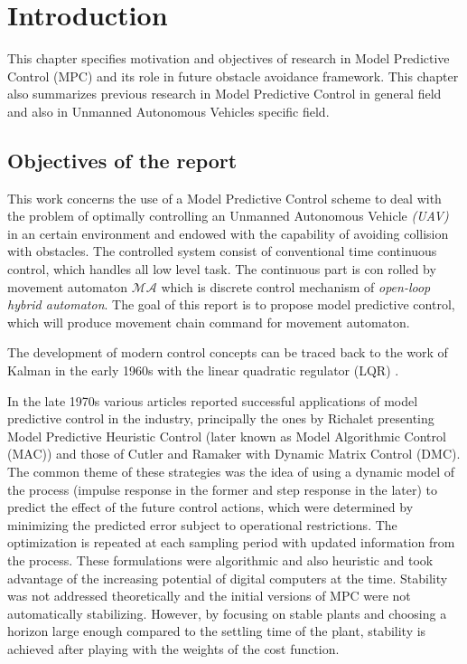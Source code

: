 \chapter{Introduction}\label{ch:introduction}

\noindent This chapter specifies motivation and objectives of research in Model Predictive Control (MPC) and its role in future obstacle avoidance framework. This chapter also summarizes previous research in Model Predictive Control in general field and also in Unmanned Autonomous Vehicles specific field.

\section{Objectives of the report}\noindent
This work concerns the use of a Model Predictive Control scheme to deal with the problem of optimally controlling an Unmanned Autonomous Vehicle \textit{(UAV)} in an certain environment and endowed with the capability of avoiding collision with obstacles. The controlled system consist of conventional time continuous control, which handles all low level task. The continuous part is con rolled by movement automaton $\mathscr{MA}$ which is discrete control mechanism of \textit{open-loop hybrid automaton}. The goal of this report is to propose model predictive control, which will produce movement chain command for movement automaton. 

The development of modern control concepts can be traced back to the work of Kalman in the early 1960s with the linear quadratic regulator (LQR) \cite{kalman1960contributions}. 

In the late 1970s various articles reported successful applications of model predictive control in the industry, principally the ones by Richalet \cite{richalet1978model} presenting Model Predictive Heuristic Control (later known as Model Algorithmic Control (MAC)) and those of Cutler and Ramaker \cite{cutler1980dynamic} with Dynamic Matrix Control (DMC). The  common theme of these strategies was the idea of using a dynamic model of the process (impulse response in the former and step response in the later) to predict the effect of the future control actions, which were determined by minimizing the predicted error subject to operational restrictions. The optimization is repeated at each sampling period with updated information from the process. These formulations were algorithmic and also heuristic and took advantage of the increasing potential of digital computers at the time. Stability was not addressed theoretically and the initial versions of MPC were not automatically stabilizing. However, by focusing on stable plants and choosing a horizon large enough compared to the settling time of the plant, stability is achieved after playing with the weights of the cost function. 

